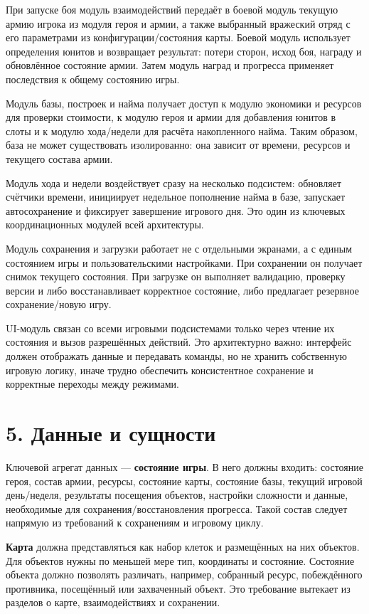 \documentclass[12pt,a4paper]{article}
\begin{document}
При запуске боя модуль взаимодействий передаёт в боевой модуль текущую армию игрока из модуля героя и армии, а также выбранный вражеский отряд с его параметрами из конфигурации/состояния карты. Боевой модуль использует определения юнитов и возвращает результат: потери сторон, исход боя, награду и обновлённое состояние армии. Затем модуль наград и прогресса применяет последствия к общему состоянию игры.

Модуль базы, построек и найма получает доступ к модулю экономики и ресурсов для проверки стоимости, к модулю героя и армии для добавления юнитов в слоты и к модулю хода/недели для расчёта накопленного найма. Таким образом, база не может существовать изолированно: она зависит от времени, ресурсов и текущего состава армии.

Модуль хода и недели воздействует сразу на несколько подсистем: обновляет счётчики времени, инициирует недельное пополнение найма в базе, запускает автосохранение и фиксирует завершение игрового дня. Это один из ключевых координационных модулей всей архитектуры.

Модуль сохранения и загрузки работает не с отдельными экранами, а с единым состоянием игры и пользовательскими настройками. При сохранении он получает снимок текущего состояния. При загрузке он выполняет валидацию, проверку версии и либо восстанавливает корректное состояние, либо предлагает резервное сохранение/новую игру.

UI-модуль связан со всеми игровыми подсистемами только через чтение их состояния и вызов разрешённых действий. Это архитектурно важно: интерфейс должен отображать данные и передавать команды, но не хранить собственную игровую логику, иначе трудно обеспечить консистентное сохранение и корректные переходы между режимами.

\section*{5. Данные и сущности}

Ключевой агрегат данных --- \textbf{состояние игры}. В него должны входить: состояние героя, состав армии, ресурсы, состояние карты, состояние базы, текущий игровой день/неделя, результаты посещения объектов, настройки сложности и данные, необходимые для сохранения/восстановления прогресса. Такой состав следует напрямую из требований к сохранениям и игровому циклу.

\textbf{Карта} должна представляться как набор клеток и размещённых на них объектов. Для объектов нужны по меньшей мере тип, координаты и состояние. Состояние объекта должно позволять различать, например, собранный ресурс, побеждённого противника, посещённый или захваченный объект. Это требование вытекает из разделов о карте, взаимодействиях и сохранении.
\end{document}
